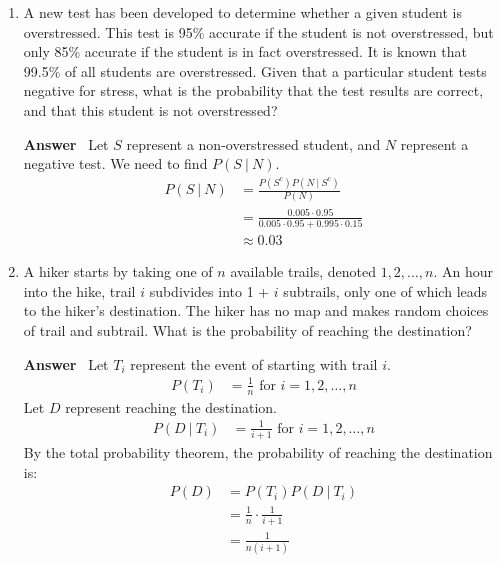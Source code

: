 \documentclass[paper=usletter, fontsize=12pt]{article}
\newcommand{\ans}{\textbf{Answer} \ }
\newcommand\given[1][]{\:#1\vert\:}
\begin{document}
\begin{enumerate}
        \ans The probability of correct digit: 1/10. Let $n$ be the number of
        dials. Then:
        \begin{align*}
            n \cdot \frac{1}{10} & > 0.5 \\
            n & > 0.5 \cdot 10 \\
            n & > 5
        \end{align*}
        Therefore, the minimum number of dials required is $n=6$.

        \item A new test has been developed to determine whether a given
        student is overstressed. This test is 95\% accurate if the student is
        not overstressed, but only 85\% accurate if the student is in fact
        overstressed. It is known that 99.5\% of all students are overstressed.
        Given that a particular student tests negative for stress, what is the
        probability that the test results are correct, and that this student is
        not overstressed?

        \ans Let $S$ represent a non-overstressed student, and $N$ represent a
        negative test. We need to find $P(S \given N)$.
        \begin{align*}
            P(S \given N) & = \frac{P(S^c)P(N \given S^c)}{P(N)} \\
            & = \frac{0.005 \cdot 0.95}{0.005 \cdot 0.95 + 0.995 \cdot 0.15 }\\
            & \approx 0.03
        \end{align*}

        \item A hiker starts by taking one of $n$ available trails, denoted $1,
        2, \ldots, n$. An hour into the hike, trail $i$ subdivides into 1 +
        $i$ subtrails, only one of which leads to the hiker’s destination. The
        hiker has no map and makes random choices of trail and subtrail. What
        is the probability of reaching the destination?

        \ans Let $T_i$ represent the event of starting with trail $i$.
        \begin{align*}
            P(T_i) & = \frac{1}{n} \text{ \ for \ } i = 1, 2, \ldots, n
        \end{align*}
        Let $D$ represent reaching the destination.
        \begin{align*}
            P(D \given T_i) & = \frac{1}{i+1} \text{ \ for \ } i = 1, 2,
            \ldots, n
        \end{align*}
        By the total probability theorem, the probability of reaching the
        destination is:
        \begin{align*}
            P(D) & = P(T_i)P(D \given T_i) \\
            & = \frac{1}{n} \cdot \frac{1}{i+1} \\
            & = \frac{1}{n(i+1)}
        \end{align*}


    \end{enumerate}
\end{document}
